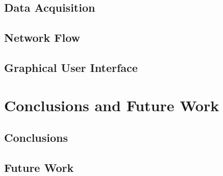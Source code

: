 \section{Data Acquisition}
\section{Network Flow}
\section{Graphical User Interface}


\chapter{Conclusions and Future Work}
\section{Conclusions}
\section{Future Work}

